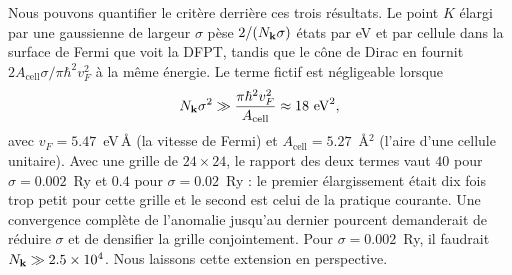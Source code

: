 Nous pouvons quantifier le critère derrière ces trois résultats. Le point $K$ élargi par une gaussienne de largeur $\sigma$ pèse $2/(N_{\mathbf{k}}\sigma)$ états par eV et par cellule dans la surface de Fermi que voit la DFPT, tandis que le cône de Dirac en fournit $2A_\text{cell}\sigma/\pi\hbar^2v_F^2$ à la même énergie. Le terme fictif est négligeable lorsque
\begin{equation}
    N_{\mathbf{k}}\sigma^2\gg\frac{\pi\hbar^2v_F^2}{A_\text{cell}}\approx 18~\text{eV}^2,\label{eqn:kohn_critere}
\end{equation}
avec $v_F=5.47$~eV\,\AA{} (la vitesse de Fermi) et $A_\text{cell}=5.27$~\AA$^2$ (l'aire d'une cellule unitaire). Avec une grille de $24\times 24$, le rapport des deux termes vaut $40$ pour $\sigma=0.002$~Ry et $0.4$ pour $\sigma=0.02$~Ry : le premier élargissement était dix fois trop petit pour cette grille et le second est celui de la pratique courante. Une convergence complète de l'anomalie jusqu'au dernier pourcent demanderait de réduire $\sigma$ et de densifier la grille conjointement. Pour $\sigma=0.002$~Ry, il faudrait $N_{\mathbf{k}}\gg 2.5\times 10^4$. Nous laissons cette extension en perspective.

